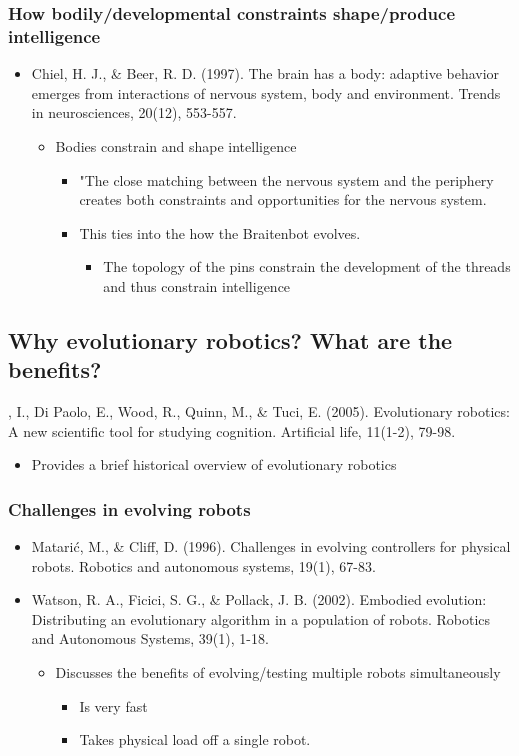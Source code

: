 \documentclass[11pt]{article}
\begin{document}
\subsubsection*{How bodily/developmental constraints shape/produce intelligence}
\label{sec:orgheadline2}
\begin{itemize}
\item Chiel, H. J., \& Beer, R. D. (1997). The brain has a body: adaptive behavior emerges from interactions of nervous system, body and environment. Trends in neurosciences, 20(12), 553-557.
\begin{itemize}
\item Bodies constrain and shape intelligence
\begin{itemize}
\item "The close matching between the nervous system and the periphery creates both constraints and opportunities for the nervous system.
\item This ties into the how the Braitenbot evolves. 
\begin{itemize}
\item The topology of the pins constrain the development of the threads and thus constrain intelligence
\end{itemize}
\end{itemize}
\end{itemize}
\end{itemize}
\subsection*{Why evolutionary robotics? What are the benefits?}
\label{sec:orgheadline5}
\Harvey, I., Di Paolo, E., Wood, R., Quinn, M., \& Tuci, E. (2005). Evolutionary robotics: A new scientific tool for studying cognition.  Artificial life, 11(1-2), 79-98.
\begin{itemize}
\item Provides a brief historical overview of evolutionary robotics
\end{itemize}
\subsubsection*{Challenges in evolving robots}
\label{sec:orgheadline4}
\begin{itemize}
\item Matarić, M., \& Cliff, D. (1996). Challenges in evolving controllers for physical robots. Robotics and autonomous systems, 19(1), 67-83.
\item Watson, R. A., Ficici, S. G., \& Pollack, J. B. (2002). Embodied evolution: Distributing an evolutionary algorithm in a population of robots. Robotics and Autonomous Systems, 39(1), 1-18.
\begin{itemize}
\item Discusses the benefits of evolving/testing multiple robots simultaneously
\begin{itemize}
\item Is very fast
\item Takes physical load off a single robot.
\end{itemize}
\end{itemize}
\end{itemize}
\end{document}
